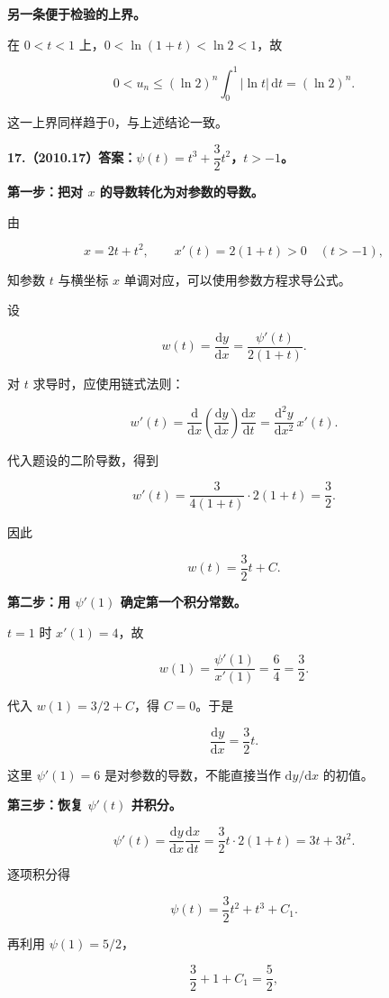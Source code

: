 \documentclass[UTF8,11pt,fontset=windows]{ctexart}
\begin{document}
\textbf{另一条便于检验的上界。}

在 $0<t<1$ 上，$0<\ln(1+t)<\ln2<1$，故

$$
0<u_n\le(\ln2)^n\int_0^1|\ln t|\,\mathrm dt=(\ln2)^n.
$$

这一上界同样趋于0，与上述结论一致。

\clearpage

\textbf{17.（2010.17）答案：$\psi(t)=t^3+\dfrac32t^2$，$t>-1$。}

\textbf{第一步：把对 $x$ 的导数转化为对参数的导数。}

由

$$
x=2t+t^2,\qquad x'(t)=2(1+t)>0\quad(t>-1),
$$

知参数 $t$ 与横坐标 $x$ 单调对应，可以使用参数方程求导公式。

设

$$
w(t)=\frac{\mathrm dy}{\mathrm dx}
=\frac{\psi'(t)}{2(1+t)}.
$$

对 $t$ 求导时，应使用链式法则：

$$
w'(t)=\frac{\mathrm d}{\mathrm dx}\left(\frac{\mathrm dy}{\mathrm dx}\right)
\frac{\mathrm dx}{\mathrm dt}
=\frac{\mathrm d^2y}{\mathrm dx^2}\,x'(t).
$$

代入题设的二阶导数，得到

$$
w'(t)=\frac3{4(1+t)}\cdot2(1+t)=\frac32.
$$

因此

$$
w(t)=\frac32t+C.
$$

\textbf{第二步：用 $\psi'(1)$ 确定第一个积分常数。}

$t=1$ 时 $x'(1)=4$，故

$$
w(1)=\frac{\psi'(1)}{x'(1)}=\frac64=\frac32.
$$

代入 $w(1)=3/2+C$，得 $C=0$。于是

$$
\frac{\mathrm dy}{\mathrm dx}=\frac32t.
$$

这里 $\psi'(1)=6$ 是对参数的导数，不能直接当作 $\mathrm dy/\mathrm dx$ 的初值。

\textbf{第三步：恢复 $\psi'(t)$ 并积分。}

$$
\psi'(t)=\frac{\mathrm dy}{\mathrm dx}\frac{\mathrm dx}{\mathrm dt}
=\frac32t\cdot2(1+t)=3t+3t^2.
$$

逐项积分得

$$
\psi(t)=\frac32t^2+t^3+C_1.
$$

再利用 $\psi(1)=5/2$，

$$
\frac32+1+C_1=\frac52,
$$
\end{document}
